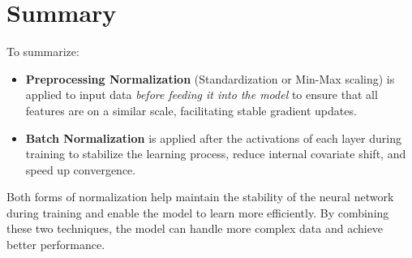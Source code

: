 \documentclass{article}
\begin{document}
\section*{Summary}
To summarize:
\begin{itemize}
    \item \textbf{Preprocessing Normalization} (Standardization or Min-Max scaling) is applied to input data \textit{before feeding it into the model} to ensure that all features are on a similar scale, facilitating stable gradient updates.
    \item \textbf{Batch Normalization} is applied after the activations of each layer during training to stabilize the learning process, reduce internal covariate shift, and speed up convergence.
\end{itemize}

Both forms of normalization help maintain the stability of the neural network during training and enable the model to learn more efficiently. By combining these two techniques, the model can handle more complex data and achieve better performance.
\end{document}
